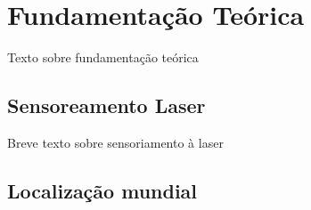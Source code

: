 \chapter{Fundamenta\c{c}\~{a}o Teórica}
Texto sobre fundamenta\c{c}\~{a}o teórica

\section{Sensoreamento Laser}
Breve texto sobre sensoriamento \`{a} laser

\section{Localiza\c{c}\~{a}o mundial}